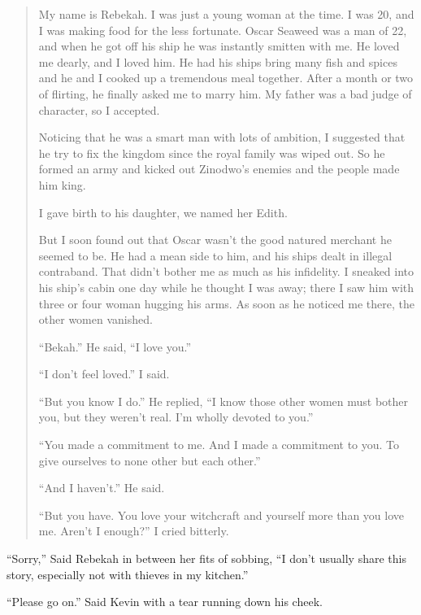 \begin{quote}
My name is Rebekah. I was just a young woman at the time. I was 20, and I was making food for the less fortunate. Oscar Seaweed was a man of 22, and when he got off his ship he was instantly smitten with me. He loved me dearly, and I loved him. He had his ships bring many fish and spices and he and I cooked up a tremendous meal together. After a month or two of flirting, he finally asked me to marry him. My father was a bad judge of character, so I accepted.

Noticing that he was a smart man with lots of ambition, I suggested that he try to fix the kingdom since the royal family was wiped out. So he formed an army and kicked out Zinodwo's enemies and the people made him king.

I gave birth to his daughter, we named her Edith.

But I soon found out that Oscar wasn't the good natured merchant he seemed to be. He had a mean side to him, and his ships dealt in illegal contraband. That didn't bother me as much as his infidelity. I sneaked into his ship's cabin one day while he thought I was away; there I saw him with three or four woman hugging his arms. As soon as he noticed me there, the other women vanished.

``Bekah.'' He said, ``I love you.''

``I don't feel loved.'' I said.

``But you know I do.'' He replied, ``I know those other women must bother you, but they weren't real. I'm wholly devoted to you.''

``You made a commitment to me. And I made a commitment to you. To give ourselves to none other but each other.''

``And I haven't.'' He said.

``But you have. You love your witchcraft and yourself more than you love me. Aren't I enough?'' I cried bitterly.

\end{quote}

``Sorry,'' Said Rebekah in between her fits of sobbing, ``I don't usually share this story, especially not with thieves in my kitchen.''

``Please go on.'' Said Kevin with a tear running down his cheek.

